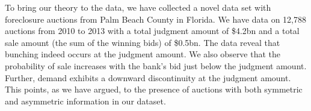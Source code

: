 \documentclass[11pt,twopage]{article}
\begin{document}


To bring our theory to the data, we have collected a novel data set
with foreclosure auctions from Palm Beach County in Florida. We have
data on 12,788 auctions from 2010 to 2013 with a total judgment amount
of \$4.2bn and a total sale amount (the sum of the winning bids) of
\$0.5bn. The data reveal that bunching indeed occurs at the judgment
amount. We also observe that the probability of sale increases with
the bank's bid just below the judgment amount. Further, demand
exhibits a downward discontinuity at the judgment amount. This points,
as we have argued, to the presence of auctions with both symmetric and
asymmetric information in our dataset.

\end{document}

